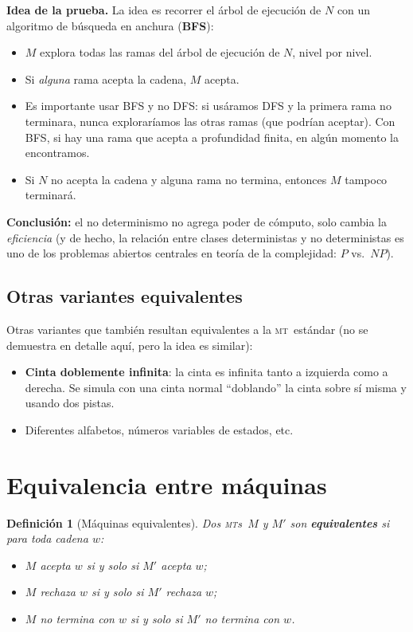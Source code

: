 \documentclass[11pt,a4paper]{article}
\theoremstyle{definicion}
\newtheorem{definicion}{Definición}[section]
\newcommand{\MT}{\textsc{mt}}
\newcommand{\MTs}{\textsc{mt}s}
\begin{document}
\textbf{Idea de la prueba.} La idea es recorrer el árbol de ejecución de $N$ con un algoritmo de búsqueda en anchura (\textbf{BFS}):
\begin{itemize}
    \item $M$ explora todas las ramas del árbol de ejecución de $N$, nivel por nivel.
    \item Si \emph{alguna} rama acepta la cadena, $M$ acepta.
    \item Es importante usar BFS y no DFS: si usáramos DFS y la primera rama no terminara, nunca exploraríamos las otras ramas (que podrían aceptar). Con BFS, si hay una rama que acepta a profundidad finita, en algún momento la encontramos.
    \item Si $N$ no acepta la cadena y alguna rama no termina, entonces $M$ tampoco terminará.
\end{itemize}

\textbf{Conclusión:} el no determinismo no agrega poder de cómputo, solo cambia la \emph{eficiencia} (y de hecho, la relación entre clases deterministas y no deterministas es uno de los problemas abiertos centrales en teoría de la complejidad: $P$ vs.\ $NP$).

\subsection{Otras variantes equivalentes}

Otras variantes que también resultan equivalentes a la \MT\ estándar (no se demuestra en detalle aquí, pero la idea es similar):
\begin{itemize}
    \item \textbf{Cinta doblemente infinita}: la cinta es infinita tanto a izquierda como a derecha. Se simula con una cinta normal ``doblando'' la cinta sobre sí misma y usando dos pistas.
    \item Diferentes alfabetos, números variables de estados, etc.
\end{itemize}

\section{Equivalencia entre máquinas}

\begin{definicion}[Máquinas equivalentes]
Dos \MTs\ $M$ y $M'$ son \textbf{equivalentes} si para toda cadena $w$:
\begin{itemize}
    \item $M$ acepta $w$ si y solo si $M'$ acepta $w$;
    \item $M$ rechaza $w$ si y solo si $M'$ rechaza $w$;
    \item $M$ no termina con $w$ si y solo si $M'$ no termina con $w$.
\end{itemize}
\end{definicion}
\end{document}
